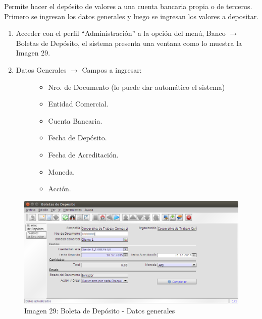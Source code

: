 \documentclass[letterpaper,10pt,spanish]{sphinxmanual}
\begin{document}
Permite hacer el depósito de valores a una cuenta bancaria propia o de terceros. Primero se ingresan los datos generales y luego se ingresan los valores a depositar.
\begin{enumerate}
\item {} 
Acceder con el perfil ``Administración'' a la opción del menú, Banco \(\rightarrow\)  Boletas de Depósito, el sistema presenta una ventana como lo muestra la Imagen 29.

\item {} \begin{description}
\item[{Datos Generales \(\rightarrow\) Campos a ingresar:}] \leavevmode\begin{itemize}
\item {} 
Nro. de Documento (lo puede dar automático el sistema)

\item {} 
Entidad Comercial.

\item {} 
Cuenta Bancaria.

\item {} 
Fecha de Depósito.

\item {} 
Fecha de Acreditación.

\item {} 
Moneda.

\item {} 
Acción.

\end{itemize}

\end{description}

\end{enumerate}
\begin{figure}[htbp]
\centering
\capstart

\includegraphics{ly_bancos_29.png}
\caption{Imagen 29: Boleta de Depósito - Datos generales}\end{figure}
\end{document}
